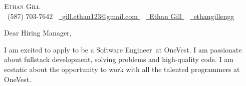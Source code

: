 
\newcommand{\userName}{Ethan Gill}
\newcommand{\userFullName}{Ethan Gill}
\newcommand{\userPhone}{(587) 703-7642}
\newcommand{\userEmail}{gill.ethan123@gmail.com}
\newcommand{\userGithub}{ethangillengg}
\newcommand{\userLinkedIn}{https://www.linkedin.com/in/ethan-gill-008a00258/}
\newcommand{\currentUniversity}{the University of Calgary's Schulich School of Engineering}
\newcommand{\companyName}{OneVest}
\newcommand{\jobTitle}{Software Engineer}
\newcommand{\introTopics}{fullstack development, solving problems and high-quality code}
\newcommand{\whyMePersonalized}{Since my graduation, I have been able to utilize all of the concepts I learned through my education while also expanding my knowledge base and gaining experience by working on many different projects each with their own specific business requirements.

	\par
	Currently I am working at a consulting company, Sunwapta Solutions, where I meet directly with clients to gather business requirements, as well as leading my team on best practices and process. I also regularly work with, and have deep experience in React as well as Node.js. This will allow me to transition smoothly into the role at \companyName.
}



\begin{center}
	{\Huge \scshape \userFullName} \\ \vspace{4pt}
	\small \raisebox{-0.1\height}\faPhone\ \userPhone ~
	\href{mailto:\userEmail}{
		\raisebox{-0.2\height}\faEnvelope\  \underline{\userEmail}
	} ~
	\href{\userLinkedIn}{
		\raisebox{-0.2\height}\faLinkedin\ \underline{\userName}
	} ~
	\href{https://github.com/\userGithub}{
		\raisebox{-0.2\height}\faGithub\ \underline{\userGithub}
	} 
\end{center}

\vspace{8pt}

\noindent{}\large{Dear Hiring Manager,}

\par{}

I am excited to apply to be a \jobTitle~at \companyName. I am passionate about \introTopics. I am ecstatic about the opportunity to work with all the talented programmers at \companyName.

